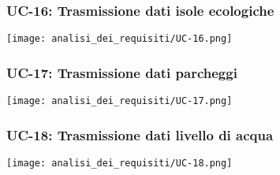 \subsubsection{UC-16: Trasmissione dati isole ecologiche}
\begin{center}
	\texttt{[image: analisi\_dei\_requisiti/UC-16.png]}
\end{center}

\subsubsection{UC-17: Trasmissione dati parcheggi}
\begin{center}
	\texttt{[image: analisi\_dei\_requisiti/UC-17.png]}
\end{center}

\subsubsection{UC-18: Trasmissione dati livello di acqua}
\begin{center}
	\texttt{[image: analisi\_dei\_requisiti/UC-18.png]}
\end{center}





